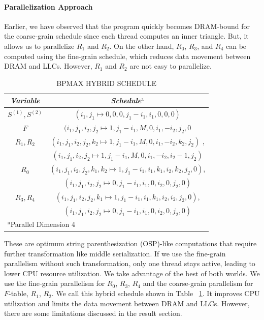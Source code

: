 \paragraph{Parallelization Approach}
Earlier, we have observed that the program quickly becomes DRAM-bound for the coarse-grain schedule since each thread computes an inner triangle. But, it allows us to parallelize $R_{1}$ and $R_{2}$.  On the other hand, $R_{0}$, $R_{3}$, and $R_{4}$ can be computed using the fine-grain schedule, which reduces data movement between DRAM and LLCs. However, $R_{1}$ and $R_{2}$ are not easy to parallelize.
\begin{table}[htbp]
\caption{\uppercase{BPMax hybrid schedule}}
\begin{center}
\begin{tabular}{|c|c|}
\hline
\textbf{\textit{Variable}}& \textbf{\textit{Schedule}}$^{\mathrm{a}}$ \\
\hline
 $S^{(1)}, S^{(2)}$ & $(i_{1},j_{1} \mapsto 0, 0, 0, j_{1}-i_{1}, i_{1}, 0, 0, 0)$   \\
\cline{1-2} 
 $F$ & $(i_{1},j_{1},i_{2},j_{2} \mapsto 1, j_{1}-i_{1}, M, 0, i_{1}, -i_{2}, j_{2}, 0$   \\
\cline{1-2} 
$R_{1}, R_{2}$ & $(i_{1},j_{1},i_{2},j_{2},k_{2} \mapsto 1, j_{1}-i_{1}, M, 0, i_{1}, -i_{2}, k_{2}, j_{2})$ ,   \\
 & $(i_{1},j_{1},i_{2},j_{2} \mapsto 1, j_{1}-i_{1}, M, 0, i_{1}, -i_{2}, i_{2}-1, j_{2})$ \\
 \cline{1-2} 
$R_{0}$ & $(i_{1},j_{1},i_{2},j_{2},k_{1},k_{2} \mapsto 1, j_{1}-i_{1}, i_{1}, k_{1}, i_{2}, k_{2}, j_{2}, 0)$,    \\
 & $(i_{1},j_{1},i_{2},j_{2} \mapsto 0, j_{1}-i_{1}, i_{1}, 0, i_{2}, 0, j_{2}, 0)$ \\
\cline{1-2} 
$R_{3}, R_{4}$ & $(i_{1},j_{1},i_{2},j_{2},k_{1} \mapsto 1, j_{1}-i_{1}, i_{1}, k_{1}, i_{2}, i_{2}, j_{2},0)$,    \\
 & $(i_{1},j_{1},i_{2},j_{2} \mapsto 0, j_{1}-i_{1}, i_{1}, 0, i_{2}, 0, j_{2}, 0)$ \\
 \cline{1-2} 
\hline
\multicolumn{2}{l}{$^{\mathrm{a}}$Parallel Dimension 4}
\end{tabular}
\label{tab:hybrid_schedule}
\end{center}
\end{table}
These are optimum string parenthesization (OSP)-like computations that require further transformation like middle serialization. If we use the fine-grain parallelism without such transformation, only one thread stays active, leading to lower CPU resource utilization. We take advantage of the best of both worlds. We use the fine-grain parallelism for $R_{0}$, $R_{3}$, $R_{4}$ and the coarse-grain parallelism for $F$-table, $R_{1}$, $R_{2}$. We call this hybrid schedule shown in Table ~\ref{tab:hybrid_schedule}. It improves CPU utilization and limits the data movement between DRAM and LLCs. However, there are some limitations discussed in the result section.


